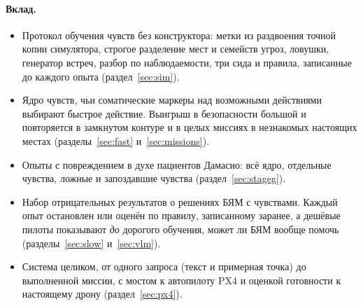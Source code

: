 \documentclass[10pt]{article}
\begin{document}
\paragraph{Вклад.}
\begin{itemize}
\item Протокол обучения чувств без конструктора: метки из раздвоения точной копии симулятора, строгое разделение мест и семейств
угроз, ловушки, генератор встреч, разбор по наблюдаемости, три сида и правила, записанные до каждого опыта (раздел~\ref{sec:sim}).
\item Ядро чувств, чьи соматические маркеры над возможными действиями выбирают быстрое действие. Выигрыш в безопасности большой и
повторяется в замкнутом контуре и в целых миссиях в незнакомых настоящих местах (разделы~\ref{sec:fast} и~\ref{sec:missions}).
\item Опыты с повреждением в духе пациентов Дамасио: всё ядро, отдельные чувства, ложные и запоздавшие чувства
(раздел~\ref{sec:stageg}).
\item Набор отрицательных результатов о решениях БЯМ с чувствами. Каждый опыт остановлен или оценён по правилу, записанному
заранее, а дешёвые пилоты показывают \emph{до} дорогого обучения, может ли БЯМ вообще помочь (разделы~\ref{sec:slow}
и~\ref{sec:vlm}).
\item Система целиком, от одного запроса (текст и примерная точка) до выполненной миссии, с мостом к автопилоту PX4 и оценкой
готовности к настоящему дрону (раздел~\ref{sec:px4}).
\end{itemize}
\end{document}
